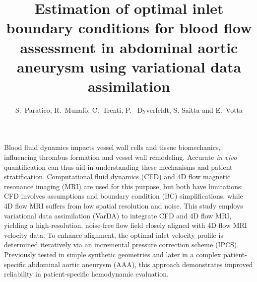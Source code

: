 \graphicspath{{chapters/paratico/graphics/}}

\title{Estimation of optimal inlet boundary conditions for blood flow assessment in abdominal aortic aneurysm using variational data assimilation}

\author{S.~Paratico, R.~Munaf\`o, C.~Trenti, P.~ Dyverfeldt, S. Saitta and E.~Votta}

\maketitle

\abstract{}
Blood fluid dynamics impacts vessel wall cells and tissue biomechanics, influencing thrombus formation and vessel wall remodeling. Accurate \textit{in vivo} quantification can thus aid in understanding these mechanisms and patient stratification. Computational fluid dynamics (CFD) and 4D flow magnetic resonance imaging (MRI) are used for this purpose, but both have limitations: CFD involves assumptions and boundary condition (BC) simplifications, while 4D flow MRI suffers from low spatial resolution and noise. This study employs variational data assimilation (VarDA) to integrate CFD and 4D flow MRI, yielding a high-resolution, noise-free flow field closely aligned with 4D flow MRI velocity data. To enhance alignment, the optimal inlet velocity profile is determined iteratively via an incremental pressure correction scheme (IPCS). Previously tested in simple synthetic geometries and later in a complex  patient-specific abdominal aortic aneurysm (AAA), this approach demonstrates improved reliability in patient-specific hemodynamic evaluation. 


